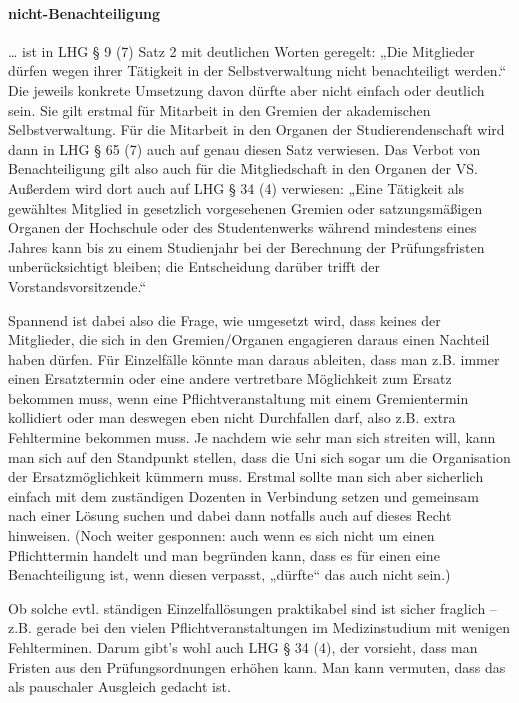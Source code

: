 \documentclass[
10pt,
a4paper,
twoside,								%
titlepage=false,							%
draft=false								%
]{scrartcl}
\begin{document}
\paragraph{nicht-Benachteiligung}

… ist in LHG § 9 (7) Satz 2 mit deutlichen Worten geregelt: „Die Mitglieder dürfen wegen ihrer Tätigkeit in der Selbstverwaltung nicht benachteiligt werden.“ Die jeweils konkrete Umsetzung davon dürfte aber nicht einfach oder deutlich sein. Sie gilt erstmal für Mitarbeit in den Gremien der akademischen Selbstverwaltung. Für die Mitarbeit in den Organen der Studierendenschaft wird dann in LHG § 65 (7) auch auf genau diesen Satz verwiesen. Das Verbot von Benachteiligung gilt also auch für die Mitgliedschaft in den Organen der VS. Außerdem wird dort auch auf LHG § 34 (4) verwiesen: „Eine Tätigkeit als gewähltes Mitglied in gesetzlich vorgesehenen Gremien oder satzungsmäßigen Organen der Hochschule oder des Studentenwerks während mindestens eines Jahres kann bis zu einem Studienjahr bei der Berechnung der Prüfungsfristen unberücksichtigt bleiben; die Entscheidung darüber trifft der Vorstandsvorsitzende.“

Spannend ist dabei also die Frage, wie umgesetzt wird, dass keines der Mitglieder, die sich in den Gremien/Organen engagieren daraus einen Nachteil haben dürfen. Für Einzelfälle könnte man daraus ableiten, dass man z.B. immer einen Ersatztermin oder eine andere vertretbare Möglichkeit zum Ersatz bekommen muss, wenn eine Pflichtveranstaltung mit einem Gremientermin kollidiert oder man deswegen eben nicht Durchfallen darf, also z.B. extra Fehltermine bekommen muss. Je nachdem wie sehr man sich streiten will, kann man sich auf den Standpunkt stellen, dass die Uni sich sogar um die Organisation der Ersatzmöglichkeit kümmern muss. Erstmal sollte man sich aber sicherlich einfach mit dem zuständigen Dozenten in Verbindung setzen und gemeinsam nach einer Lösung suchen und dabei dann notfalls auch auf dieses Recht hinweisen. (Noch weiter gesponnen: auch wenn es sich nicht um einen Pflichttermin handelt und man begründen kann, dass es für einen eine Benachteiligung ist, wenn diesen verpasst, „dürfte“ das auch nicht sein.)

Ob solche evtl. ständigen Einzelfallösungen praktikabel sind ist sicher fraglich – z.B. gerade bei den vielen Pflichtveranstaltungen im Medizinstudium mit wenigen Fehlterminen. Darum gibt's wohl auch LHG § 34 (4), der vorsieht, dass man Fristen aus den Prüfungsordnungen erhöhen kann. Man kann vermuten, dass das als pauschaler Ausgleich gedacht ist.
\end{document}
